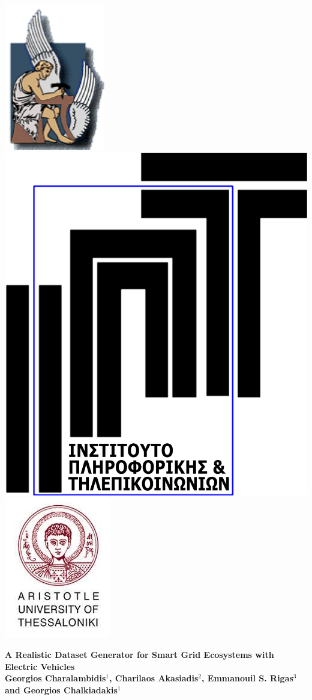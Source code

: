 \documentclass{article}
\title{}
\author{}
\date{}
\begin{document}

\begin{center}
  \begin{minipage}{.19\linewidth}
    \includegraphics[width=0.3\linewidth]{figures/tuc_logo.png}
\includegraphics[width=0.3\linewidth]{figures/IIT_logo.png}
\includegraphics[width=0.3\linewidth]{figures/auth_logo.jpg}
  \end{minipage}
  \begin{minipage}{.6\linewidth}
    \begin{center}
      \Huge \color{DarkGreen} \textbf{A Realistic Dataset Generator for Smart Grid Ecosystems
with Electric Vehicles}\\\vspace{10pt}
\large \color{Black} \textbf{Georgios Charalambidis$^{1}$, Charilaos Akasiadis$^{2}$, Emmanouil S. Rigas$^{3}$ and Georgios Chalkiadakis$^{1}$}\\[0.2cm] %

\end{center}
\end{minipage}
\end{center}
\end{document}
